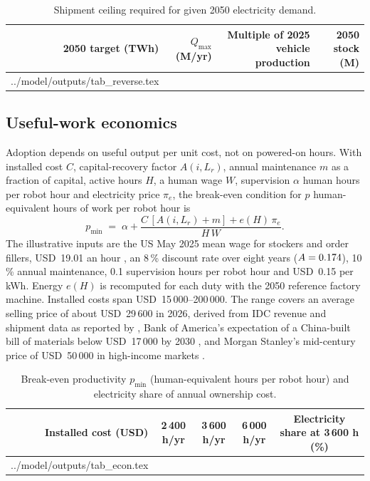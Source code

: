 \documentclass[11pt]{article}
\begin{document}
\begin{table}[t]
\centering\small
\caption{Shipment ceiling required for given 2050 electricity demand.}
\label{tab:reverse}
\begin{tabular}{@{}r r r r@{}}
\toprule
2050 target (TWh) & $Q_{\max}$ (M/yr) & Multiple of 2025 vehicle production & 2050 stock (M) \\
\midrule
{} ../model/outputs/tab_reverse.tex 
\bottomrule
\end{tabular}
\end{table}

\subsection{Useful-work economics}
Adoption depends on useful output per unit cost, not on powered-on hours. With installed cost $C$, capital-recovery factor $A(i,L_r)$, annual maintenance $m$ as a fraction of capital, active hours $H$, a human wage $W$, supervision $\alpha$ human hours per robot hour and electricity price $\pi_e$, the break-even condition for $p$ human-equivalent hours of work per robot hour is
\begin{equation}\label{eq:breakeven}
p_{\min} \;=\; \alpha + \frac{C\,[A(i,L_r)+m] + e(H)\,\pi_e}{H\,W}.
\end{equation}
The illustrative inputs are the US May 2025 mean wage for stockers and order fillers, USD~19.01 an hour \citep{bls2026}, an 8\,\% discount rate over eight years ($A=0.174$), 10\,\% annual maintenance, 0.1 supervision hours per robot hour and USD~0.15 per kWh. Energy $e(H)$ is recomputed for each duty with the 2050 reference factory machine. Installed costs span USD~15\,000--200\,000. The range covers an average selling price of about USD~29\,600 in 2026, derived from IDC revenue and shipment data as reported by \citet{idc2026}, Bank of America's expectation of a China-built bill of materials below USD~17\,000 by 2030 \citep{bofa2026}, and Morgan Stanley's mid-century price of USD~50\,000 in high-income markets \citep{ms2025}.

\begin{table}[t]
\centering\small
\caption{Break-even productivity $p_{\min}$ (human-equivalent hours per robot hour) and electricity share of annual ownership cost.}
\label{tab:econ}
\begin{tabular}{@{}r c c c c@{}}
\toprule
Installed cost (USD) & 2\,400 h/yr & 3\,600 h/yr & 6\,000 h/yr & Electricity share at 3\,600 h (\%) \\
\midrule
{} ../model/outputs/tab_econ.tex 
\bottomrule
\end{tabular}
\end{table}
\end{document}
